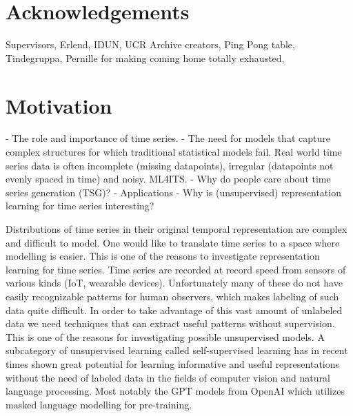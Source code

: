 \documentclass[../../thesis.tex]{subfiles}
\begin{document}
\section{Acknowledgements}
Supervisors, Erlend, IDUN, UCR Archive creators, Ping Pong table, Tindegruppa, Pernille for making coming home totally exhausted, 

\section{Motivation}
	- The role and importance of time series.
	- The need for models that capture complex structures for which traditional statistical models fail. 
Real world time series data is often incomplete (missing datapoints), irregular (datapoints not evenly spaced in time) and noisy. ML4ITS. 
	- Why do people care about time series generation (TSG)?
		- Applications
	- Why is (unsupervised) representation learning for time series interesting?

Distributions of time series in their original temporal representation are complex and difficult to model. One would like to translate time series to a space where modelling is easier. This is one of the reasons to investigate representation learning for time series. Time series are recorded at record speed from sensors of various kinds (IoT, wearable devices). Unfortunately many of these do not have easily recognizable patterns for human observers, which makes labeling of such data quite difficult. In order to take advantage of this vast amount of unlabeled data we need techniques that can extract useful patterns without supervision. This is one of the reasons for investigating possible unsupervised models. A subcategory of unsupervised learning called self-supervised learning has in recent times shown great potential for learning informative and useful representations without the need of labeled data in the fields of computer vision and natural language processing. Most notably the GPT models from OpenAI which utilizes masked language modelling for pre-training. 
\end{document}
